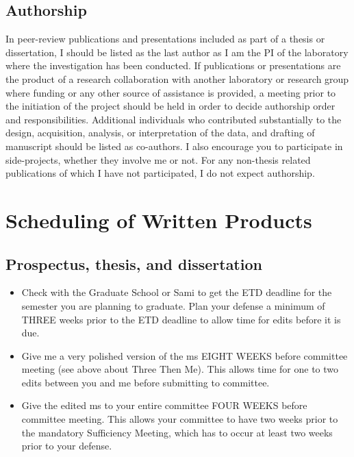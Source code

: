 \documentclass[
]{article}
\providecommand{\tightlist}{%
  \setlength{\itemsep}{0pt}\setlength{\parskip}{0pt}}
\begin{document}
\hypertarget{authorship}{%
\subsection{Authorship}\label{authorship}}

In peer-review publications and presentations included as part of a thesis or dissertation, I should be listed as the last author as I am the PI of the laboratory where the investigation has been conducted. If publications or presentations are the product of a research collaboration with another laboratory or research group where funding or any other source of assistance is provided, a meeting prior to the initiation of the project should be held in order to decide authorship order and responsibilities. Additional individuals who contributed substantially to the design, acquisition, analysis, or interpretation of the data, and drafting of manuscript should be listed as co-authors. I also encourage you to participate in side-projects, whether they involve me or not. For any non-thesis related publications of which I have not participated, I do not expect authorship.

\hypertarget{scheduling-of-written-products}{%
\section{\texorpdfstring{\textbf{Scheduling of Written Products}}{Scheduling of Written Products}}\label{scheduling-of-written-products}}

\hypertarget{prospectus-thesis-and-dissertation}{%
\subsection{Prospectus, thesis, and dissertation}\label{prospectus-thesis-and-dissertation}}

\begin{itemize}
\tightlist
\item
  Check with the Graduate School or Sami to get the ETD deadline for the semester you are planning to graduate. Plan your defense a minimum of THREE weeks prior to the ETD deadline to allow time for edits before it is due.
\item
  Give me a very polished version of the ms EIGHT WEEKS before committee meeting (see above about Three Then Me). This allows time for one to two edits between you and me before submitting to committee.
\item
  Give the edited ms to your entire committee FOUR WEEKS before committee meeting. This allows your committee to have two weeks prior to the mandatory Sufficiency Meeting, which has to occur at least two weeks prior to your defense.
\end{itemize}
\end{document}
